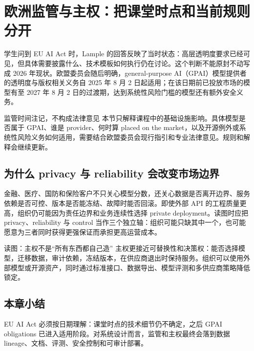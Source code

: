 \section{欧洲监管与主权：把课堂时点和当前规则分开}

学生问到 EU AI Act 时，Lample 的回答反映了当时状态：高层透明度要求已经可见，但具体需要披露什么、技术模板如何执行仍在讨论。这个判断不能原封不动写成 2026 年现状。欧盟委员会随后明确，general-purpose AI（GPAI）模型提供者的透明度与版权相关义务自 2025 年 8 月 2 日起适用；在该日期前已投放市场的模型有至 2027 年 8 月 2 日的过渡期，达到系统性风险门槛的模型还有额外安全义务。

\begin{warningbox}{监管时间注记，不构成法律意见}
本节只解释课程中的基础设施影响。具体模型是否属于 GPAI、谁是 provider、何时算 placed on the market，以及开源例外或系统性风险义务如何适用，需要结合欧盟委员会现行指引和专业法律意见。规则和解释会继续更新。
\end{warningbox}

\subsection{为什么 privacy 与 reliability 会改变市场边界}

金融、医疗、国防和保险客户不只关心模型分数，还关心数据是否离开边界、服务依赖是否可控、版本是否能冻结、故障时能否回滚。即使外部 API 的工程质量更高，组织仍可能因为责任边界和业务连续性选择 private deployment。读图时应把 privacy、reliability 与 control 当作三个独立轴：组织可能只缺其中一个，也可能愿意为三者同时获得更强保证而承担更高运营成本。


\begin{knowledgebox}{读图：主权不是“所有东西都自己造”}
主权更接近可替换性和决策权：能否选择模型，迁移数据，审计依赖，冻结版本，在供应商退出时保持服务。组织可以使用外部模型或开源资产，同时通过标准接口、数据导出、模型评测和多供应商策略降低锁定。
\end{knowledgebox}


\subsection{本章小结}

EU AI Act 必须按日期理解：课堂时点的技术细节仍不确定，之后 GPAI obligations 已进入适用阶段。对系统设计而言，监管和主权最终会落到数据 lineage、文档、评测、安全控制和可审计部署。

